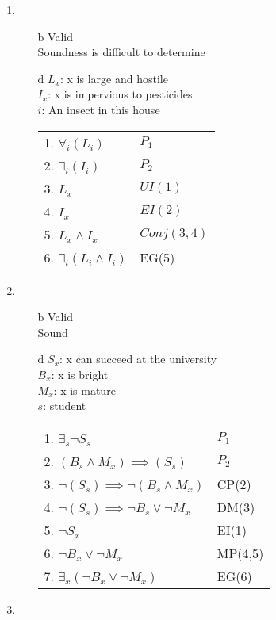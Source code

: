 \documentclass{article}
\begin{document}
\begin{enumerate}
\begin{enumerate}
			\end{enumerate}
		\item
			\begin{enumerate}
				\item[b]
					Valid\\
					Soundness is difficult to determine
				\item[d]
					$L_x$: x is large and hostile\\
					$I_x$: x is impervious to pesticides\\
					$i$: An insect in this house\\
					\begin{tabular}{l l}
						1. $\forall _i (L_i)$ & $P_1$\\
						2. $\exists _i (I_i)$ & $P_2$\\
						3. $L_x$ & $UI(1)$\\
						4. $I_x$ & $EI(2)$ \\
						5. $L_x \land I_x$ & $Conj(3,4)$\\
						6. $\exists _i (L_i \land I_i)$ & EG(5)
					\end{tabular}
			\end{enumerate}
		\item
			\begin{enumerate}
				\item[b]
					Valid\\
					Sound
				\item[d]
					$S_x$: x can succeed at the university\\
					$B_x$: x is bright\\
					$M_x$: x is mature\\
					$s$: student\\
					\begin{tabular}{l l}
						1. $\exists _s \lnot S_s$ & $P_1$\\
						2. $(B_s \land M_x) \implies (S_s)$ & $P_2$\\
						3. $\lnot (S_s) \implies \lnot(B_s \land M_x)$ & CP(2)\\
						4. $\lnot (S_s) \implies \lnot B_s \lor \lnot M_x$ & DM(3)\\
						5. $\lnot S_x$ & EI(1)\\
						6. $\lnot B_x \lor \lnot M_x$ & MP(4,5)\\
						7. $\exists _x (\lnot B_x \lor \lnot M_x)$ & EG(6)\\
					\end{tabular}
			\end{enumerate}
		\item

\end{enumerate}
\end{document}
